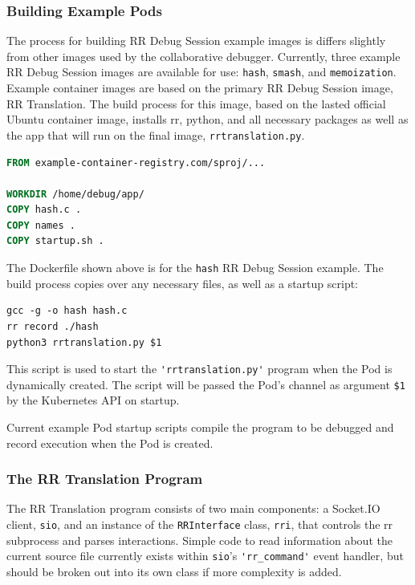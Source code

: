\documentclass[12pt]{article}
\begin{document}
\subsubsection{Building Example Pods} \label{buildingchannel}

The process for building RR Debug Session example images is differs
slightly from other images used by the collaborative debugger.
Currently, three example RR Debug Session images are available for
use: \lstinline{hash}, \lstinline{smash}, and \lstinline{memoization}.
Example container images are based on the primary RR Debug Session
image, RR Translation.  The build process for this image, based on the
lasted official Ubuntu container image, installs rr, python, and all
necessary packages as well as the app that will run on the final
image, \lstinline{rrtranslation.py}.

\begin{lstlisting}[language=Dockerfile,basicstyle=\linespread{0.5}\ttfamily,caption={RR Debug Session Hash Example---Dockerfile},captionpos=b]
FROM example-container-registry.com/sproj/...
  
WORKDIR /home/debug/app/
COPY hash.c .
COPY names .
COPY startup.sh .
\end{lstlisting}

The Dockerfile shown above is for the \lstinline{hash} RR Debug
Session example.  The build process copies over any necessary files,
as well as a startup script:

\begin{lstlisting}[basicstyle=\linespread{0.5}\ttfamily,caption={Example Startup Script},captionpos=b]
gcc -g -o hash hash.c
rr record ./hash
python3 rrtranslation.py $1
\end{lstlisting}

This script is used to start the \lstinline{'rrtranslation.py'} program
when the Pod is dynamically created.  The script will be passed the
Pod's channel as argument \lstinline{$1} by the Kubernetes API on
startup.
\par

Current example Pod startup scripts compile the program to be debugged
and record execution when the Pod is created.

\subsubsection{The RR Translation Program} \label{joiningchannel}

The RR Translation program consists of two main components: a
Socket.IO client, \lstinline{sio}, and an instance of the
\lstinline{RRInterface} class, \lstinline{rri}, that controls the rr
subprocess and parses interactions.  Simple code to read information
about the current source file currently exists within
\lstinline{sio}'s \lstinline{'rr_command'} event handler, but should
be broken out into its own class if more complexity is added.
\par
\end{document}
